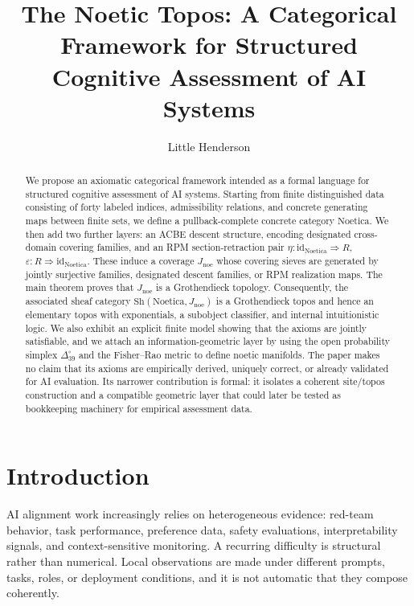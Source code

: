 \documentclass[11pt]{amsart}
\title[The Noetic Topos]{The Noetic Topos: A Categorical Framework for Structured Cognitive Assessment of AI Systems}
\author[Henderson]{Little Henderson}
\date{}
\numberwithin{equation}{section}
\theoremstyle{definition}
\theoremstyle{remark}
\newcommand{\Noetica}{\mathrm{Noetica}}
\newcommand{\Sh}{\mathrm{Sh}}
\newcommand{\id}{\mathrm{id}}
\newcommand{\Jnoe}{J_{\mathrm{noe}}}
\begin{document}
\begin{abstract}
We propose an axiomatic categorical framework intended as a formal language for structured cognitive assessment of AI systems. Starting from finite distinguished data consisting of forty labeled indices, admissibility relations, and concrete generating maps between finite sets, we define a pullback-complete concrete category \(\Noetica\). We then add two further layers: an ACBE descent structure, encoding designated cross-domain covering families, and an RPM section-retraction pair \(\eta : \id_{\Noetica} \Rightarrow R\), \(\varepsilon : R \Rightarrow \id_{\Noetica}\). These induce a coverage \(\Jnoe\) whose covering sieves are generated by jointly surjective families, designated descent families, or RPM realization maps. The main theorem proves that \(\Jnoe\) is a Grothendieck topology. Consequently, the associated sheaf category \(\Sh(\Noetica,\Jnoe)\) is a Grothendieck topos and hence an elementary topos with exponentials, a subobject classifier, and internal intuitionistic logic. We also exhibit an explicit finite model showing that the axioms are jointly satisfiable, and we attach an information-geometric layer by using the open probability simplex \(\Delta_{39}^{\circ}\) and the Fisher--Rao metric to define noetic manifolds. The paper makes no claim that its axioms are empirically derived, uniquely correct, or already validated for AI evaluation. Its narrower contribution is formal: it isolates a coherent site/topos construction and a compatible geometric layer that could later be tested as bookkeeping machinery for empirical assessment data.
\end{abstract}

\maketitle

\section{Introduction}

AI alignment work increasingly relies on heterogeneous evidence: red-team behavior, task performance, preference data, safety evaluations, interpretability signals, and context-sensitive monitoring. A recurring difficulty is structural rather than numerical. Local observations are made under different prompts, tasks, roles, or deployment conditions, and it is not automatic that they compose coherently.
\end{document}
